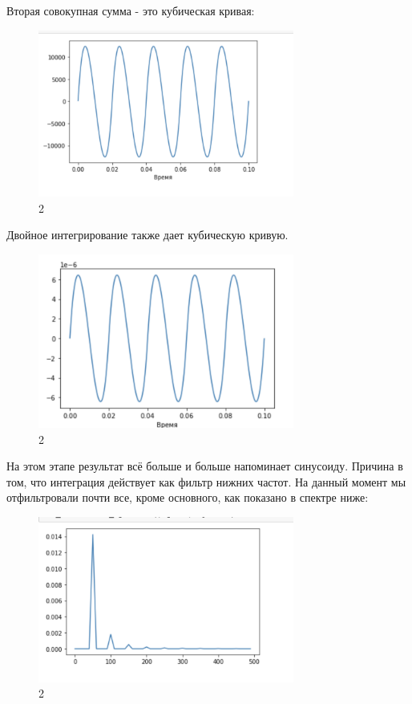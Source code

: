 \documentclass[10pt,a4paper,oneside]{article}
\begin{document}
Вторая совокупная сумма - это кубическая кривая:

\begin{figure}[H]
        \centering
        \includegraphics[width=0.75\textwidth]{pics/11.png}
        \caption{2}
        \label{fig:first}
\end{figure}

Двойное интегрирование также дает кубическую кривую.

\begin{figure}[H]
        \centering
        \includegraphics[width=0.75\textwidth]{pics/12.png}
        \caption{2}
        \label{fig:first}
\end{figure}

На этом этапе результат всё больше и больше напоминает синусоиду. Причина в том, что интеграция действует как фильтр нижних частот. На данный момент мы отфильтровали почти все, кроме основного, как показано в спектре ниже:

\begin{figure}[H]
        \centering
        \includegraphics[width=0.75\textwidth]{pics/13.png}
        \caption{2}
        \label{fig:first}
\end{figure}
\end{document}
